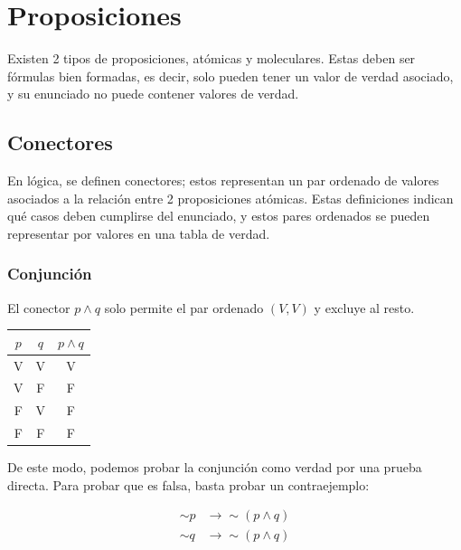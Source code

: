\chapter{Proposiciones}

  Existen 2 tipos de proposiciones, atómicas y moleculares. Estas deben ser
  fórmulas bien formadas, es decir, solo pueden tener un valor de verdad
  asociado, y su enunciado no puede contener valores de verdad.

  \section{Conectores}

  En lógica, se definen conectores; estos representan un par ordenado de
  valores asociados a la relación entre 2 proposiciones atómicas. Estas
  definiciones indican qué casos deben cumplirse del enunciado, y estos
  pares ordenados se pueden representar por valores en una tabla de verdad.

  \subsection{Conjunción}

  \begin{minipage}[t]{0.48\textwidth}
  \begin{definition}[title={Conjunción}]
  El conector $p \land q$ solo permite el par ordenado $(V, V)$ y excluye
  al resto.
  \end{definition}
  \end{minipage}

  \begin{minipage}[t]{0.48\textwidth}
  \begin{tabular}{c|c|c}
  $p$ & $q$ & $p \land q$ \\
  \hline
  V & V & V \\
  V & F & F \\
  F & V & F \\
  F & F & F \\
  \end{tabular}
  \end{minipage}

  De este modo, podemos probar la conjunción como verdad por una prueba
  directa. Para probar que es falsa, basta probar un contraejemplo:

  \begin{align}
  \sim p &\to \sim(p \land q) \\
  \sim q &\to \sim(p \land q)
  \end{align}

